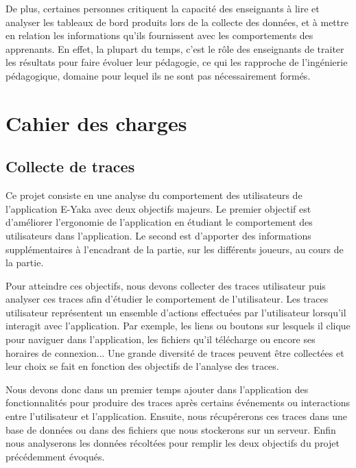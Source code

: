             De plus, certaines personnes critiquent la capacité des enseignants à lire et analyser les tableaux de bord produits lors de la collecte des données, et à mettre en relation les informations qu’ils fournissent avec les comportements des apprenants. En effet, la plupart du temps, c'est le rôle des enseignants de traiter les résultats pour faire évoluer leur pédagogie, ce qui les rapproche de l’ingénierie pédagogique, domaine pour lequel ils ne sont pas nécessairement formés.
        
       


    \section{Cahier des charges}

        \subsection{Collecte de traces}
            
            Ce projet consiste en une analyse du comportement des utilisateurs de l’application E-Yaka avec deux objectifs majeurs. Le premier objectif est d’améliorer l’ergonomie de l’application en étudiant le comportement des utilisateurs dans l’application. Le second est d’apporter des informations supplémentaires à l’encadrant de la partie, sur les différents joueurs, au cours de la partie.
            
            Pour atteindre ces objectifs, nous devons collecter des traces utilisateur puis analyser ces traces afin d’étudier le comportement de l’utilisateur. Les traces utilisateur représentent un ensemble d’actions effectuées par l’utilisateur lorsqu’il interagit avec l’application. Par exemple, les liens ou boutons sur lesquels il clique pour naviguer dans l’application, les fichiers qu’il télécharge ou encore ses horaires de connexion... Une grande diversité de traces peuvent être collectées et leur choix se fait en fonction des objectifs de l’analyse des traces.
            
            Nous devons donc dans un premier temps ajouter dans l’application des fonctionnalités pour produire des traces après certains événements ou interactions entre l’utilisateur et l’application. Ensuite, nous récupérerons ces traces dans une base de données ou dans des fichiers que nous stockerons sur un serveur. Enfin nous analyserons les données récoltées pour remplir les deux objectifs du projet précédemment évoqués.
            

